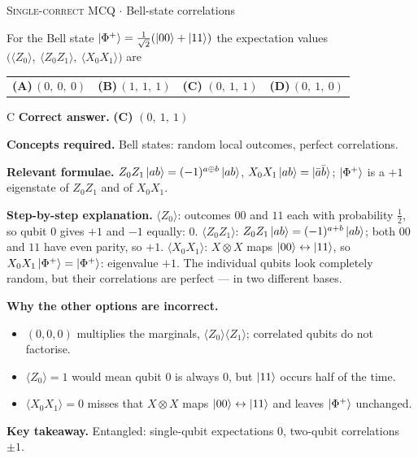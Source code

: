 \documentclass[11pt,a4paper]{article}
\newcommand{\optlabel}[1]{\textbf{(#1)}}
\newcommand{\correctlabel}[1]{\textcolor{okgreen}{\textbf{(#1)}\,\ding{51}}}
\newenvironment{qitem}[1]{\begin{list}{}{\setlength{\leftmargin}{3.3em}\setlength{\labelwidth}{3.1em}%
  \setlength{\labelsep}{0.2em}\setlength{\topsep}{3pt}\setlength{\parsep}{3pt}}\item[\textbf{Q.#1}\hfill]}{\end{list}}
\newcommand{\qsep}{\par\vspace{2pt}{\color{black!15}\hrule}\vspace{4pt}}
\newcommand{\qmeta}[2]{{\footnotesize\color{black!60}\textsc{#1} \;$\cdot$\; #2}\par}
\begin{document}
\begin{qitem}{25}
\qmeta{Single-correct MCQ}{Bell-state correlations}
For the Bell state $\ket{\Phi^+} = \frac{1}{\sqrt2}(\ket{00} + \ket{11})$ the expectation values
$\big(\langle Z_0\rangle,\ \langle Z_0Z_1\rangle,\ \langle X_0X_1\rangle\big)$ are
\par\smallskip\noindent\begin{tabularx}{\linewidth}{@{}*{4}{L}@{}}
\optlabel{A}\,$(0,\ 0,\ 0)$ & \optlabel{B}\,$(1,\ 1,\ 1)$ & \correctlabel{C}\,$(0,\ 1,\ 1)$ & \optlabel{D}\,$(0,\ 1,\ 0)$
\end{tabularx}
\end{qitem}
\begin{solbox}{C}
\textbf{\color{brand}Correct answer.} \textcolor{okgreen}{\textbf{(C)}} $(0,\ 1,\ 1)$

\textbf{\color{brand}Concepts required.} Bell states: random local outcomes, perfect correlations.

\textbf{\color{brand}Relevant formulae.} $Z_0Z_1\ket{ab} = (-1)^{a\oplus b}\ket{ab}$, $X_0X_1\ket{ab} = \ket{\bar a\bar b}$; $\ket{\Phi^+}$ is a $+1$ eigenstate of $Z_0Z_1$ and of $X_0X_1$.

\textbf{\color{brand}Step-by-step explanation.} $\langle Z_0\rangle$: outcomes $00$ and $11$ each with probability $\frac12$, so qubit 0 gives $+1$ and $-1$ equally: $0$.
$\langle Z_0Z_1\rangle$: $Z_0Z_1\ket{ab} = (-1)^{a+b}\ket{ab}$; both $00$ and $11$ have even parity, so $+1$.
$\langle X_0X_1\rangle$: $X\otimes X$ maps $\ket{00} \leftrightarrow \ket{11}$, so $X_0X_1\ket{\Phi^+} = \ket{\Phi^+}$: eigenvalue $+1$.
The individual qubits look completely random, but their correlations are perfect --- in two different bases.

\textbf{\color{brand}Why the other options are incorrect.}
\begin{itemize}[leftmargin=2.4em, itemsep=1pt, topsep=2pt]
\item[\textbf{(A)}] $(0, 0, 0)$ multiplies the marginals, $\langle Z_0\rangle\langle Z_1\rangle$; correlated qubits do not factorise.
\item[\textbf{(B)}] $\langle Z_0\rangle = 1$ would mean qubit 0 is always $0$, but $\ket{11}$ occurs half of the time.
\item[\textbf{(D)}] $\langle X_0X_1\rangle = 0$ misses that $X\otimes X$ maps $\ket{00}\leftrightarrow\ket{11}$ and leaves $\ket{\Phi^+}$ unchanged.
\end{itemize}
\textbf{\color{brand}Key takeaway.} Entangled: single-qubit expectations 0, two-qubit correlations $\pm1$.
\end{solbox}
\qsep
\end{document}
